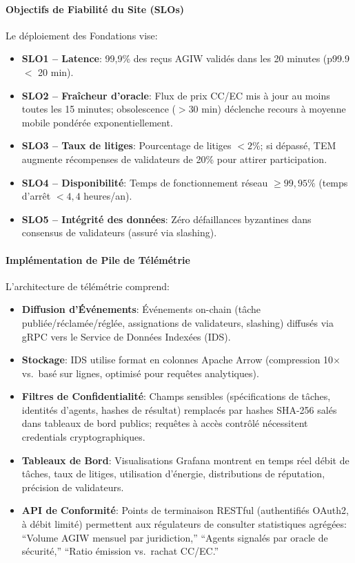 \documentclass[11pt]{article}
\begin{document}
\paragraph{Objectifs de Fiabilité du Site (SLOs)} Le déploiement des Fondations vise:
\begin{itemize}[noitemsep]
  \item \textbf{SLO1 -- Latence}: 99,9\% des reçus AGIW validés dans les 20 minutes (p99.9 $<$ 20 min).
  \item \textbf{SLO2 -- Fraîcheur d'oracle}: Flux de prix CC/EC mis à jour au moins toutes les 15 minutes; obsolescence ($>30$ min) déclenche recours à moyenne mobile pondérée exponentiellement.
  \item \textbf{SLO3 -- Taux de litiges}: Pourcentage de litiges $<2\%$; si dépassé, TEM augmente récompenses de validateurs de 20\% pour attirer participation.
  \item \textbf{SLO4 -- Disponibilité}: Temps de fonctionnement réseau $\geq 99,95\%$ (temps d'arrêt $<4,4$ heures/an).
  \item \textbf{SLO5 -- Intégrité des données}: Zéro défaillances byzantines dans consensus de validateurs (assuré via slashing).
\end{itemize}

\paragraph{Implémentation de Pile de Télémétrie} L'architecture de télémétrie comprend:
\begin{itemize}[noitemsep]
  \item \textbf{Diffusion d'Événements}: Événements on-chain (tâche publiée/réclamée/réglée, assignations de validateurs, slashing) diffusés via gRPC vers le Service de Données Indexées (IDS).
  \item \textbf{Stockage}: IDS utilise format en colonnes Apache Arrow (compression 10$\times$ vs.\ basé sur lignes, optimisé pour requêtes analytiques).
  \item \textbf{Filtres de Confidentialité}: Champs sensibles (spécifications de tâches, identités d'agents, hashes de résultat) remplacés par hashes SHA-256 salés dans tableaux de bord publics; requêtes à accès contrôlé nécessitent credentials cryptographiques.
  \item \textbf{Tableaux de Bord}: Visualisations Grafana montrent en temps réel débit de tâches, taux de litiges, utilisation d'énergie, distributions de réputation, précision de validateurs.
  \item \textbf{API de Conformité}: Points de terminaison RESTful (authentifiés OAuth2, à débit limité) permettent aux régulateurs de consulter statistiques agrégées: ``Volume AGIW mensuel par juridiction,'' ``Agents signalés par oracle de sécurité,'' ``Ratio émission vs.\ rachat CC/EC.''
\end{itemize}
\end{document}
